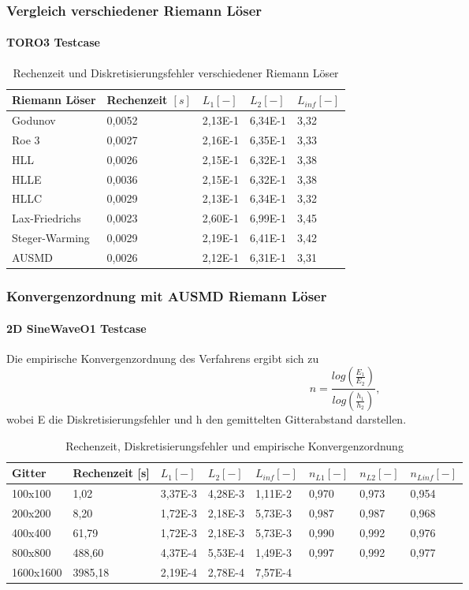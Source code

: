 \documentclass[
	11pt, %
	aspectratio=169, %
]{beamer}
\begin{document}
\begin{frame}
	\frametitle{Vergleich verschiedener Riemann Löser}
	\framesubtitle{TORO3 Testcase} %
	
		\begin{table}
			\begin{tabular}{l l l l l}
				\toprule
				Riemann Löser & Rechenzeit $[s]$ & $L_1 [-]$& $L_2 [-]$& $L_{inf} [-]$\\
				\midrule
				Godunov & 0,0052 & 2,13E-1 & 6,34E-1 & 3,32 \\
				Roe 3 & 0,0027 & 2,16E-1 & 6,35E-1 & 3,33 \\
				HLL & 0,0026 & 2,15E-1 & 6,32E-1 & 3,38 \\
				HLLE & 0,0036 & 2,15E-1 & 6,32E-1 & 3,38 \\
				HLLC & 0,0029 & 2,13E-1 & 6,34E-1 & 3,32 \\
				Lax-Friedrichs & 0,0023 & 2,60E-1 & 6,99E-1 & 3,45 \\
				Steger-Warming & 0,0029 & 2,19E-1 & 6,41E-1 & 3,42 \\
				AUSMD & 0,0026 & 2,12E-1 & 6,31E-1 & 3,31
			\end{tabular}
			\caption{Rechenzeit und Diskretisierungsfehler verschiedener Riemann Löser}
		\end{table}
\end{frame}
	
	\begin{frame}
		\frametitle{Konvergenzordnung mit AUSMD Riemann Löser}
		\framesubtitle{2D SineWaveO1 Testcase} %
		
		Die empirische Konvergenzordnung des Verfahrens ergibt sich zu
		$$n=\frac{log(\frac{E_1}{E_2})}{log(\frac{h_1}{h_2})},$$
		wobei E die Diskretisierungsfehler und h den gemittelten Gitterabstand darstellen.
		
		\begin{table}
			\begin{tabular}{l l l l l l l l}
				\toprule
				Gitter& Rechenzeit [s] & $L_1 [-]$ & $L_2 [-]$ & $L_{inf} [-]$ & $n_{L1} [-]$ & $n_{L2} [-]$ & $n_{Linf} [-]$ \\
				\midrule
				100x100 & 1,02 & 3,37E-3 & 4,28E-3 & 1,11E-2 & 0,970 & 0,973 & 0,954\\
				200x200 & 8,20 & 1,72E-3 & 2,18E-3 & 5,73E-3 &0,987 & 0,987 & 0,968 \\
				400x400 & 61,79 & 1,72E-3 & 2,18E-3 & 5,73E-3 & 0,990 & 0,992 & 0,976 \\
				800x800 & 488,60 & 4,37E-4 & 5,53E-4 & 1,49E-3 & 0,997 & 0,992 & 0,977 \\
				1600x1600 & 3985,18 & 2,19E-4 & 2,78E-4 & 7,57E-4 \\
				\bottomrule
			\end{tabular}
			\caption{Rechenzeit, Diskretisierungsfehler und empirische Konvergenzordnung}
		\end{table}
	\end{frame}
	
\end{document}
